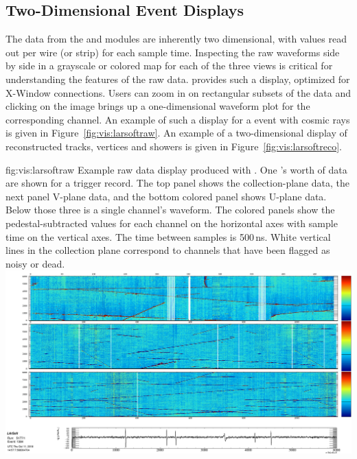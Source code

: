 \documentclass[../main-v1.tex]{subfiles}
\begin{document}
\subsection{Two-Dimensional Event Displays}
\label{sec:visualization:2d}

The data from the  and  modules are inherently two dimensional, with  values read out per wire (or strip) for each sample time.  Inspecting the raw waveforms side by side in a grayscale or colored map for each of the three views is critical for understanding the features of the raw data.   provides such a display,
optimized for X-Window connections.  Users can zoom in on rectangular subsets of the data and clicking on the image brings up a one-dimensional waveform plot for the corresponding channel.  An example of such a display for a  event with cosmic rays is given in Figure~\ref{fig:vis:larsoftraw}.  An example of a two-dimensional display of reconstructed tracks, vertices and showers is given in Figure~\ref{fig:vis:larsoftreco}.  

\begin{dunefigure}
{fig:vis:larsoftraw} 
{Example raw data display produced with .  One 's worth of data are shown for a  trigger record. The top panel shows the collection-plane data, the next panel V-plane data, and the bottom colored panel shows U-plane data.  Below those three is a single channel's waveform.  The colored panels show the pedestal-subtracted  values for each channel on the horizontal axes with sample time on the vertical axes.  The time between samples is 500\,ns.  White vertical lines in the collection plane correspond to channels that have been flagged as noisy or dead.}
\includegraphics[width=0.9 \textwidth]{graphics/EventDisplays/pdsp_larsoft_rawevent.png}
\end{dunefigure}
\end{document}
